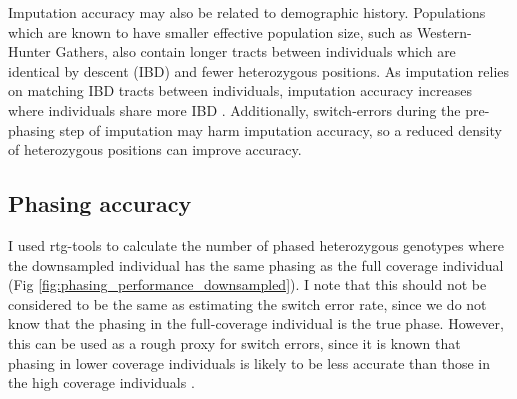 Imputation accuracy may also be related to demographic history. Populations which are known to have smaller effective population size, such as Western-Hunter Gathers, also contain longer tracts between individuals which are identical by descent (IBD) and fewer heterozygous positions. As imputation relies on matching IBD tracts between individuals, imputation accuracy increases where individuals share more IBD \cite{kong2008detection}. Additionally, switch-errors during the pre-phasing step of imputation may harm imputation accuracy, so a reduced density of heterozygous positions can improve accuracy. 

\subsection{Phasing accuracy}

I used rtg-tools to calculate the number of phased heterozygous genotypes where the downsampled individual has the same phasing as the full coverage individual (Fig \ref{fig:phasing_performance_downsampled}). I note that this should not be considered to be the same as estimating the switch error rate, since we do not know that the phasing in the full-coverage individual is the true phase. However, this can be used as a rough proxy for switch errors, since it is known that phasing in lower coverage individuals is likely to be less accurate than those in the high coverage individuals \cite{rubinacci2021efficient}.

